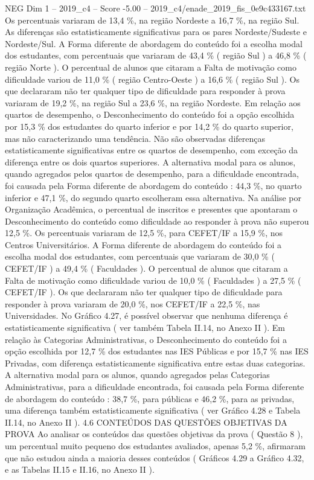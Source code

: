 \begin{textsample}{NEG Dim 1 – 2019\_c4 – Score -5.00 – 2019\_c4/enade\_2019\_fis\_0e9c433167.txt}
Os percentuais variaram de 13,4 \%, na região Nordeste a 16,7 \%, na região Sul.
As diferenças são estatisticamente significativas para os pares Nordeste/Sudeste e Nordeste/Sul.
A Forma diferente de abordagem do conteúdo foi a escolha modal dos estudantes, com percentuais que variaram de 43,4 \% ( região Sul ) a 46,8 \% ( região Norte ).
O percentual de alunos que citaram a Falta de motivação como dificuldade variou de 11,0 \% ( região Centro-Oeste ) a 16,6 \% ( região Sul ).
Os que declararam não ter qualquer tipo de dificuldade para responder à prova variaram de 19,2 \%, na região Sul a 23,6 \%, na região Nordeste.
Em relação aos quartos de desempenho, o Desconhecimento do conteúdo foi a opção escolhida por 15,3 \% dos estudantes do quarto inferior e por 14,2 \% do quarto superior, mas não caracterizando uma tendência.
Não são observadas diferenças estatisticamente significativas entre os quartos de desempenho, com exceção da diferença entre os dois quartos superiores.
A alternativa modal para os alunos, quando agregados pelos quartos de desempenho, para a dificuldade encontrada, foi causada pela Forma diferente de abordagem do conteúdo : 44,3 \%, no quarto inferior e 47,1 \%, do segundo quarto escolheram essa alternativa.
Na análise por Organização Acadêmica, o percentual de inscritos e presentes que apontaram o Desconhecimento do conteúdo como dificuldade ao responder à prova não superou 12,5 \%.
Os percentuais variaram de 12,5 \%, para CEFET/IF a 15,9 \%, nos Centros Universitários.
A Forma diferente de abordagem do conteúdo foi a escolha modal dos estudantes, com percentuais que variaram de 30,0 \% ( CEFET/IF ) a 49,4 \% ( Faculdades ).
O percentual de alunos que citaram a Falta de motivação como dificuldade variou de 10,0 \% ( Faculdades ) a 27,5 \% ( CEFET/IF ).
Os que declararam não ter qualquer tipo de dificuldade para responder à prova variaram de 20,0 \%, nos CEFET/IF a 22,5 \%, nas Universidades.
No Gráfico 4.27, é possível observar que nenhuma diferença é estatisticamente significativa ( ver também Tabela II.14, no Anexo II ).
Em relação às Categorias Administrativas, o Desconhecimento do conteúdo foi a opção escolhida por 12,7 \% dos estudantes nas IES Públicas e por 15,7 \% nas IES Privadas, com diferença estatisticamente significativa entre estas duas categorias.
A alternativa modal para os alunos, quando agregados pelas Categorias Administrativas, para a dificuldade encontrada, foi causada pela Forma diferente de abordagem do conteúdo : 38,7 \%, para públicas e 46,2 \%, para as privadas, uma diferença também estatisticamente significativa ( ver Gráfico 4.28 e Tabela II.14, no Anexo II ). 4.6 CONTEÚDOS DAS QUESTÕES OBJETIVAS DA PROVA Ao analisar os conteúdos das questões objetivas da prova ( Questão 8 ), um percentual muito pequeno dos estudantes avaliados, apenas 5,2 \%, afirmaram que não estudou ainda a maioria desses conteúdos ( Gráficos 4.29 a Gráfico 4.32, e as Tabelas II.15 e II.16, no Anexo II ).

\end{textsample}
